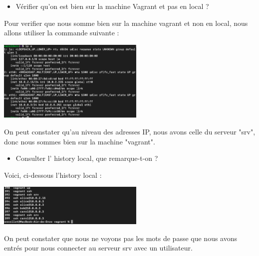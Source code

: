 \documentclass[12pt]{article}
\begin{document}
\vspace{0.3cm}

\begin{itemize}
  \item Vérifier qu'on est bien sur la machine Vagrant et pas en local ?
\end{itemize}

\vspace{0.3cm}

Pour verifier que nous somme bien sur la machine vagrant et non en local, nous allons utiliser la commande suivante : 

\vspace{0.3cm}

\begin{center}
  \includegraphics[width=7cm]{Image-TD-SSH-1/Commande-IPA.png}
\end{center}

\vspace{0.3cm}

On peut constater qu'au niveau des adresses IP, nous avons celle du serveur "srv", donc nous sommes bien sur la machine "vagrant".

\vspace{0.3cm}

\begin{itemize}
  \item Consulter l' history local, que remarque-t-on ?
\end{itemize}

\vspace{0.3cm}

Voici, ci-dessous l'history local : 

\vspace{0.3cm}

\begin{center}
  \includegraphics[width=7cm]{Image-TD-SSH-1/History-Local.png}
\end{center}

\vspace{0.3cm}

On peut constater que nous ne voyons pas les mots de passe que nous avons entrés pour nous connecter au serveur srv avec un utilisateur.
\end{document}
